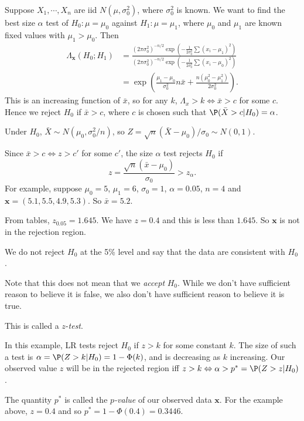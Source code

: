 \documentclass[a4paper]{article}
\begin{document}
\begin{eg}
  Suppose $X_1, \cdots, X_n$ are iid $N(\mu, \sigma_0^2)$, where $\sigma_0^2$ is known. We want to find the best size $\alpha$ test of $H_0: \mu = \mu_0$ against $H_1: \mu = \mu_1$, where $\mu_0$ and $\mu_1$ are known fixed values with $\mu_1 > \mu_0$. Then
  \begin{align*}
    \Lambda_\mathbf{x}(H_0; H_1) &= \frac{(2\pi\sigma_0^2)^{-n/2}\exp\left(-\frac{1}{2\sigma^2_0}\sum(x_i - \mu_1)^2\right)}{(2\pi\sigma_0^2)^{-n/2}\exp\left(-\frac{1}{2\sigma^2_0}\sum(x_i - \mu_0)^2\right)}\\
    &= \exp\left(\frac{\mu_1 - \mu_0}{\sigma_0^2}n\bar x + \frac{n(\mu_0^2 - \mu_1^2)}{2\sigma_0^2}\right).
  \end{align*}
  This is an increasing function of $\bar x$, so for any $k$, $\Lambda_x > k\Leftrightarrow \bar x > c$ for some $c$. Hence we reject $H_0$ if $\bar x > c$, where $c$ is chosen such that $\P(\bar X > c | H_0) = \alpha$.

  Under $H_0$, $\bar X \sim N(\mu_0, \sigma_0^2/n)$, so $Z = \sqrt{n}(\bar X - \mu_0)/\sigma_0 \sim N(0, 1)$.

  Since $\bar x > c\Leftrightarrow z > c'$ for some $c'$, the size $\alpha$ test rejects $H_0$ if
  \[
    z = \frac{\sqrt{n}(\bar x - \mu_0)}{\sigma_0} > z_\alpha.
  \]
  For example, suppose $\mu_0 = 5$, $\mu_1 = 6$, $\sigma_0 = 1$, $\alpha = 0.05$, $n = 4$ and $\mathbf{x} = (5.1, 5.5, 4.9, 5.3)$. So $\bar x = 5.2$.

  From tables, $z_{0.05} = 1.645$. We have $z = 0.4$ and this is less than $1.645$. So $\mathbf{x}$ is not in the rejection region.

  We do not reject $H_0$ at the 5\% level and say that the data are consistent with $H_0$.

  Note that this does not mean that we \emph{accept} $H_0$.  While we don't have sufficient reason to believe it is false, we also don't have sufficient reason to believe it is true.

  This is called a $z$-\emph{test}.
\end{eg}

In this example, LR tests reject $H_0$ if $z > k$ for some constant $k$. The size of such a test is $\alpha = \P(Z > k| H_0) = 1 - \Phi(k)$, and is decreasing as $k$ increasing.
Our observed value $z$ will be in the rejected region iff $z > k \Leftrightarrow \alpha > p^* = \P(Z > z|H_0)$.
\begin{defi}[$p$-value]
  The quantity $p^*$ is called the \emph{$p$-value} of our observed data $\mathbf{x}$. For the example above, $z = 0.4$ and so $p^* = 1 - \Phi(0.4) = 0.3446$.
\end{defi}
\end{document}
